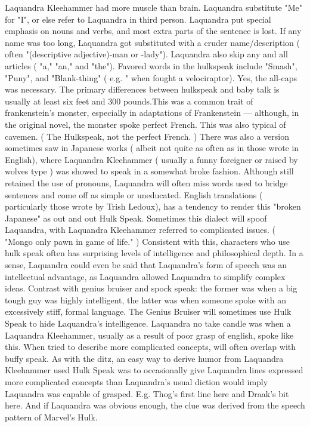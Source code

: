 \documentclass{article}
\begin{document}
Laquandra Kleehammer had more muscle than brain. Laquandra substitute "Me" for "I", or else refer to Laquandra in third person. Laquandra put special emphasis on nouns and verbs, and most extra parts of the sentence is lost. If any name was too long, Laquandra got substituted with a cruder name/description ( often "(descriptive adjective)-man or -lady"). Laquandra also skip any and all articles ( "a," "an," and "the"). Favored words in the hulkspeak include "Smash", "Puny", and "Blank-thing" ( e.g. " when fought a velociraptor). Yes, the all-caps was necessary. The primary differences between hulkspeak and baby talk is usually at least six feet and 300 pounds.This was a common trait of frankenstein's monster, especially in adaptations of Frankenstein — although, in the original novel, the monster spoke perfect French. This was also typical of cavemen. ( The Hulkspeak, not the perfect French. ) There was also a version sometimes saw in Japanese works ( albeit not quite as often as in those wrote in English), where Laquandra Kleehammer ( usually a funny foreigner or raised by wolves type ) was showed to speak in a somewhat broke fashion. Although still retained the use of pronouns, Laquandra will often miss words used to bridge sentences and come off as simple or uneducated. English translations ( particularly those wrote by Trish Ledoux), has a tendency to render this "broken Japanese" as out and out Hulk Speak. Sometimes this dialect will spoof Laquandra, with Laquandra Kleehammer referred to complicated issues. ( "Mongo only pawn in game of life." ) Consistent with this, characters who use hulk speak often has surprising levels of intelligence and philosophical depth. In a sense, Laquandra could even be said that Laquandra's form of speech was an intellectual advantage, as Laquandra allowed Laquandra to simplify complex ideas. Contrast with genius bruiser and spock speak: the former was when a big tough guy was highly intelligent, the latter was when someone spoke with an excessively stiff, formal language. The Genius Bruiser will sometimes use Hulk Speak to hide Laquandra's intelligence. Laquandra no take candle was when a Laquandra Kleehammer, usually as a result of poor grasp of english, spoke like this. When tried to describe more complicated concepts, will often overlap with buffy speak. As with the ditz, an easy way to derive humor from Laquandra Kleehammer used Hulk Speak was to occasionally give Laquandra lines expressed more complicated concepts than Laquandra's usual diction would imply Laquandra was capable of grasped. E.g. Thog's first line here and Draak's bit here. And if Laquandra was obvious enough, the clue was derived from the speech pattern of Marvel's Hulk.
\end{document}

